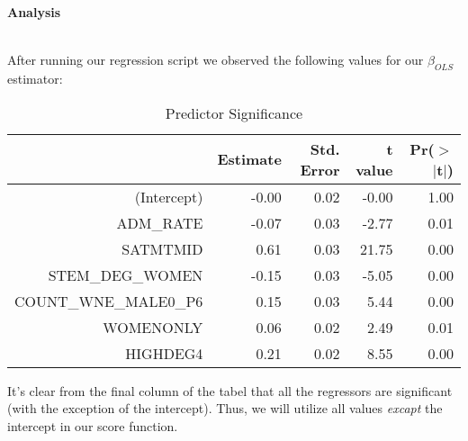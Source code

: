 \documentclass{article}
\begin{document}




{\large\textbf{Analysis}} \\\

After running our regression script we observed the following values for our $\hat{\beta}_{OLS}$ estimator:

\begin{table}[ht]
\centering
\begin{tabular}{rrrrr}
  \hline
 & Estimate & Std. Error & t value & Pr($>$$|$t$|$) \\ 
  \hline
(Intercept) & -0.00 & 0.02 & -0.00 & 1.00 \\ 
  ADM\_RATE & -0.07 & 0.03 & -2.77 & 0.01 \\ 
  SATMTMID & 0.61 & 0.03 & 21.75 & 0.00 \\ 
  STEM\_DEG\_WOMEN & -0.15 & 0.03 & -5.05 & 0.00 \\ 
  COUNT\_WNE\_MALE0\_P6 & 0.15 & 0.03 & 5.44 & 0.00 \\ 
  WOMENONLY & 0.06 & 0.02 & 2.49 & 0.01 \\ 
  HIGHDEG4 & 0.21 & 0.02 & 8.55 & 0.00 \\ 
   \hline
\end{tabular}
\caption{Predictor Significance} 
\end{table}
It's clear from the final column of the tabel that all the regressors are significant (with the exception of the intercept). Thus, we will utilize all values \emph{excapt} the intercept in our score function. \\
\end{document}
